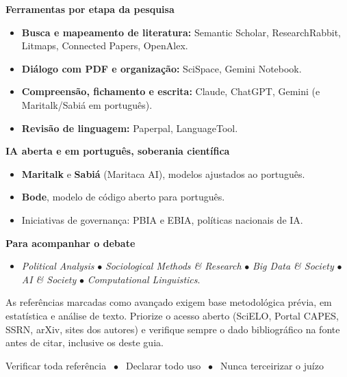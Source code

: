 \documentclass[11pt,a4paper]{article}
\begin{document}
\vspace{4pt}
\textbf{\poppinsmed\color{azulUNI}Ferramentas por etapa da pesquisa}
\begin{itemize}[leftmargin=1.4em,nosep,label={}]
\item \textbf{Busca e mapeamento de literatura:} Semantic Scholar, ResearchRabbit, Litmaps, Connected Papers, OpenAlex.
\item \textbf{Diálogo com PDF e organização:} SciSpace, Gemini Notebook.
\item \textbf{Compreensão, fichamento e escrita:} Claude, ChatGPT, Gemini (e Maritalk/Sabiá em português).
\item \textbf{Revisão de linguagem:} Paperpal, LanguageTool.
\end{itemize}

\vspace{4pt}
\textbf{\poppinsmed\color{azulUNI}IA aberta e em português, soberania científica}
\begin{itemize}[leftmargin=1.4em,nosep,label={}]
\item \textbf{Maritalk} e \textbf{Sabiá} (Maritaca AI), modelos ajustados ao português.
\item \textbf{Bode}, modelo de código aberto para português.
\item Iniciativas de governança: PBIA e EBIA, políticas nacionais de IA.
\end{itemize}

\vspace{4pt}
\textbf{\poppinsmed\color{azulUNI}Para acompanhar o debate}
\begin{itemize}[leftmargin=1.4em,nosep,label={}]
\item \textit{Political Analysis} $\bullet$ \textit{Sociological Methods \& Research} $\bullet$ \textit{Big Data \& Society} $\bullet$ \textit{AI \& Society} $\bullet$ \textit{Computational Linguistics}.
\end{itemize}

\begin{dica}
As referências marcadas como avançado exigem base metodológica prévia, em estatística e análise de texto. Priorize o acesso aberto (SciELO, Portal CAPES, SSRN, arXiv, sites dos autores) e verifique sempre o dado bibliográfico na fonte antes de citar, inclusive os deste guia.
\end{dica}

\vspace{8pt}
\begin{regra}
  \poppins\large\centering
  Verificar toda referência $\;\bullet\;$ Declarar todo uso $\;\bullet\;$ Nunca terceirizar o juízo
\end{regra}
\end{document}
